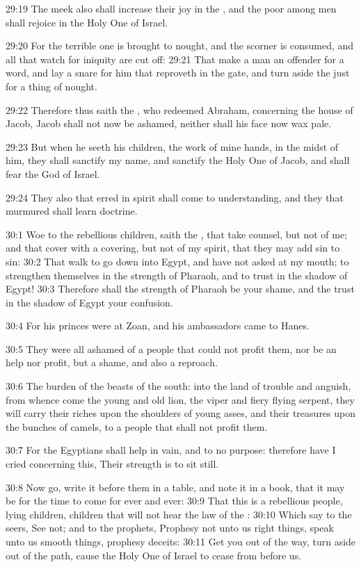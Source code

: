 29:19 The meek also shall increase their joy in the \LORD, and the poor among men shall rejoice in the Holy One of Israel.

29:20 For the terrible one is brought to nought, and the scorner is consumed, and all that watch for iniquity are cut off: 29:21 That make a man an offender for a word, and lay a snare for him that reproveth in the gate, and turn aside the just for a thing of nought.

29:22 Therefore thus saith the \LORD, who redeemed Abraham, concerning the house of Jacob, Jacob shall not now be ashamed, neither shall his face now wax pale.

29:23 But when he seeth his children, the work of mine hands, in the midst of him, they shall sanctify my name, and sanctify the Holy One of Jacob, and shall fear the God of Israel.

29:24 They also that erred in spirit shall come to understanding, and they that murmured shall learn doctrine.

30:1 Woe to the rebellious children, saith the \LORD, that take counsel, but not of me; and that cover with a covering, but not of my spirit, that they may add sin to sin: 30:2 That walk to go down into Egypt, and have not asked at my mouth; to strengthen themselves in the strength of Pharaoh, and to trust in the shadow of Egypt!  30:3 Therefore shall the strength of Pharaoh be your shame, and the trust in the shadow of Egypt your confusion.

30:4 For his princes were at Zoan, and his ambassadors came to Hanes.

30:5 They were all ashamed of a people that could not profit them, nor be an help nor profit, but a shame, and also a reproach.

30:6 The burden of the beasts of the south: into the land of trouble and anguish, from whence come the young and old lion, the viper and fiery flying serpent, they will carry their riches upon the shoulders of young asses, and their treasures upon the bunches of camels, to a people that shall not profit them.

30:7 For the Egyptians shall help in vain, and to no purpose: therefore have I cried concerning this, Their strength is to sit still.

30:8 Now go, write it before them in a table, and note it in a book, that it may be for the time to come for ever and ever: 30:9 That this is a rebellious people, lying children, children that will not hear the law of the \LORD: 30:10 Which say to the seers, See not; and to the prophets, Prophesy not unto us right things, speak unto us smooth things, prophesy deceits: 30:11 Get you out of the way, turn aside out of the path, cause the Holy One of Israel to cease from before us.

